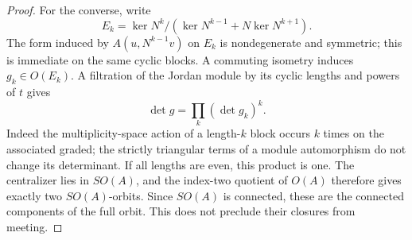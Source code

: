 \documentclass[11pt,reqno]{amsart}
\numberwithin{equation}{section}
\theoremstyle{definition}\newtheorem{definition}[theorem]{Definition}
\theoremstyle{remark}\newtheorem{remark}[theorem]{Remark}
\begin{document}
\begin{proof}
For the converse, write
\[
 E_k=\ker N^k/(\ker N^{k-1}+N\ker N^{k+1}).
\]
The form induced by \(A(u,N^{k-1}v)\) on \(E_k\) is
nondegenerate and symmetric; this is immediate on the same cyclic
blocks.  A commuting isometry induces \(g_k\in O(E_k)\).
A filtration of the Jordan module by its cyclic lengths and powers
of \(t\) gives
\[
                        \det g=\prod_k(\det g_k)^k.
\]
Indeed the multiplicity-space action of a length-\(k\) block occurs
\(k\) times on the associated graded; the strictly triangular
terms of a module automorphism do not change its determinant.
If all lengths are even, this product is one.  The centralizer lies
in \(SO(A)\), and the index-two quotient of \(O(A)\) therefore
gives exactly two \(SO(A)\)-orbits.  Since \(SO(A)\) is connected,
these are the connected components of the full orbit.  This does not
preclude their closures from meeting.
\end{proof}
\end{document}
